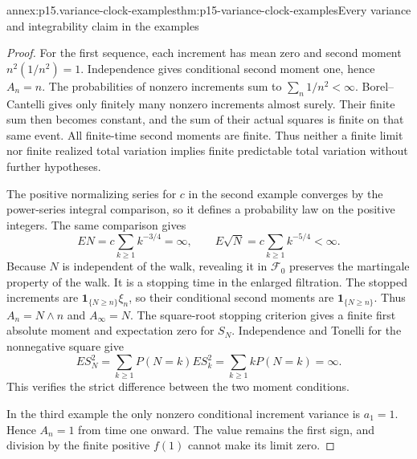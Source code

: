 \begin{annexitem}{annex:p15.variance-clock-examples}{thm:p15-variance-clock-examples}{Every variance and integrability claim in the examples}
\begin{proof}
For the first sequence, each increment has mean zero and
second moment \(n^2(1/n^2)=1\).
Independence gives conditional second moment one, hence \(A_n=n\).
The probabilities of nonzero increments sum to
\(\sum_n1/n^2<\infty\).
Borel--Cantelli gives only finitely many nonzero increments
almost surely. Their finite sum then becomes constant, and the
sum of their actual squares is finite on that same event.
All finite-time second moments are finite.
Thus neither a finite limit nor finite realized total variation
implies finite predictable total variation without further hypotheses.

The positive normalizing series for \(c\) in the second example
converges by the power-series integral comparison, so it defines
a probability law on the positive integers.
The same comparison gives
\[
                 EN=c\sum_{k\geq1}k^{-3/4}=\infty,\qquad
                 E\sqrt N=c\sum_{k\geq1}k^{-5/4}<\infty.
\]
Because \(N\) is independent of the walk, revealing it in
\(\mathcal F_0\) preserves the martingale property of the walk.
It is a stopping time in the enlarged filtration.
The stopped increments are \(\mathbf1_{\{N\geq n\}}\xi_n\),
so their conditional second moments are
\(\mathbf1_{\{N\geq n\}}\). Thus \(A_n=N\wedge n\) and
\(A_\infty=N\).
The square-root stopping criterion gives a finite first absolute
moment and expectation zero for \(S_N\).
Independence and Tonelli for the nonnegative square give
\[
                         ES_N^2=\sum_{k\geq1}P(N=k)ES_k^2
                                             =\sum_{k\geq1}kP(N=k)=\infty.
\]
This verifies the strict difference between the two moment conditions.

In the third example the only nonzero conditional increment
variance is \(a_1=1\). Hence \(A_n=1\) from time one onward.
The value remains the first sign, and division by the finite
positive \(f(1)\) cannot make its limit zero.
\end{proof}
\end{annexitem}

